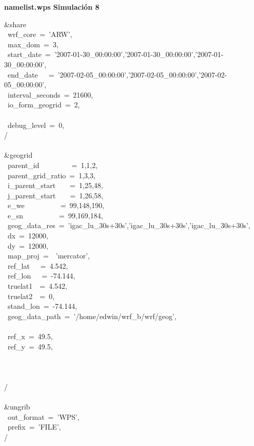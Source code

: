 \textbf{namelist.wps Simulación 8}

\&share\\
~wrf\_core~=~'ARW',\\
~max\_dom~=~3,\\
~start\_date~=~'2007-01-30\_00:00:00','2007-01-30\_00:00:00','2007-01-30\_00:00:00',\\
~end\_date~~~=~'2007-02-05\_00:00:00','2007-02-05\_00:00:00','2007-02-05\_00:00:00',~\\
~interval\_seconds~=~21600,\\
~io\_form\_geogrid~=~2,\\
\\
~debug\_level~=~0,\\
/\\
\\
\&geogrid\\
~parent\_id~~~~~~~~~=~1,1,2,\\
~parent\_grid\_ratio~=~1,3,3,\\
~i\_parent\_start~~~~=~1,25,48,\\
~j\_parent\_start~~~~=~1,26,58,\\
~e\_we~~~~~~~~~~=~99,148,190,\\
~e\_sn~~~~~~~~~~=~99,169,184,\\
~geog\_data\_res~=~'igac\_lu\_30s+30s','igac\_lu\_30s+30s','igac\_lu\_30s+30s',\\
~dx~=~12000,\\
~dy~=~12000,\\
~map\_proj~=~~'mercator',\\
~ref\_lat~~~=~4.542,\\
~ref\_lon~~~=~-74.144,\\
~truelat1~~=~4.542,\\
~truelat2~~=~0,\\
~stand\_lon~=~-74.144,\\
~geog\_data\_path~=~'/home/edwin/wrf\_b/wrf/geog',\\
\\
~ref\_x~=~49.5,\\
~ref\_y~=~49.5,\\
\\
\\
\\
/\\
\\
\&ungrib\\
~out\_format~=~'WPS',\\
~prefix~=~'FILE',\\
/\\
